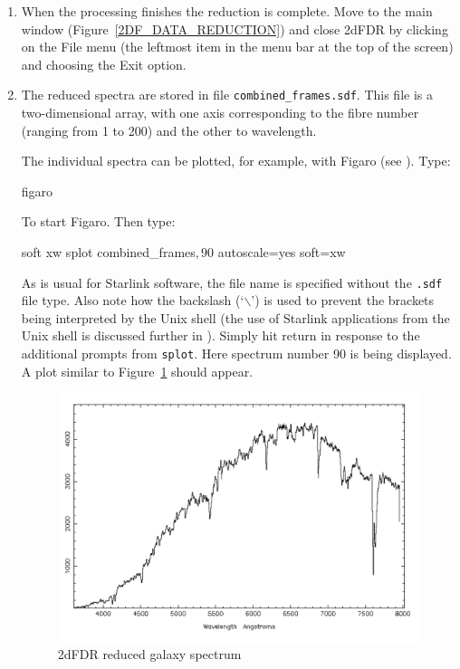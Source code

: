 \documentclass[twoside,11pt]{starlink}
\begin{document}
\begin{enumerate}
  \item When the processing finishes the reduction is complete.  Move
   to the main window (Figure~\ref{2DF_DATA_REDUCTION}) and close
   2dFDR by clicking on the \textsf{File} menu (the leftmost item in the
   menu bar at the top of the screen) and choosing the \textsf{Exit}
   option.

  \item The reduced spectra are stored in file \texttt{combined\_frames.sdf}.  This file is a two-dimensional array, with one
   axis corresponding to the fibre number (ranging from 1 to 200) and the
   other to wavelength.

   The individual spectra can be plotted, for example, with Figaro
   (see \cite{SUN86}).  Type:

\begin{terminalv}
figaro
\end{terminalv}

   To start Figaro.  Then type:

\begin{terminalv}
soft xw
splot combined_frames\(,90\) autoscale=yes soft=xw
\end{terminalv}

   As is usual for Starlink software, the file name is specified without
   the \texttt{.sdf} file type.  Also note how the backslash (`$\backslash$')
   is used to prevent the brackets being interpreted by the Unix shell
   (the use of Starlink applications from the Unix shell is discussed
   further in \/\cite{SC4}).
   Simply hit return in response to the additional prompts from \texttt{splot}.  Here spectrum number 90 is being displayed.  A plot similar
   to Figure~\ref{2DF_SPLOT} should appear.

  \begin{figure}[htbp]
     \centering
     \includegraphics[totalheight=3.6in]{sc14_2df_splot}
     \caption{2dFDR reduced galaxy spectrum
     \label{2DF_SPLOT} }
  \end{figure}

\end{enumerate}
\end{document}
